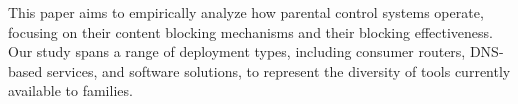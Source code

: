 This paper aims to empirically analyze how parental control systems operate, focusing on their content blocking mechanisms and their blocking effectiveness.
Our study spans a range of deployment types, including consumer routers, DNS-based services, and software solutions, to represent the diversity of tools currently available to families.


